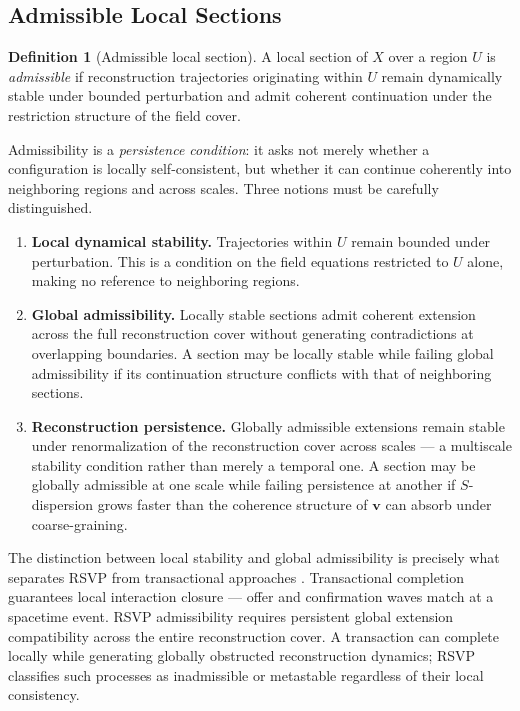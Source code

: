 \documentclass[11pt, a4paper]{article}
\theoremstyle{plain}
\theoremstyle{definition}
\newtheorem{definition}[theorem]{Definition}
\theoremstyle{remark}
\begin{document}
\subsection{Admissible Local Sections}

\begin{definition}[Admissible local section]
\label{def:admissible}
A local section of $X$ over a region $U$ is \emph{admissible} if reconstruction
trajectories originating within $U$ remain dynamically stable under bounded
perturbation and admit coherent continuation under the restriction structure of the
field cover.
\end{definition}

Admissibility is a \emph{persistence condition}: it asks not merely whether a
configuration is locally self-consistent, but whether it can continue coherently into
neighboring regions and across scales. Three notions must be carefully distinguished.

\begin{enumerate}[label=(\roman*)]
  \item \textbf{Local dynamical stability.} Trajectories within $U$ remain bounded
    under perturbation. This is a condition on the field equations restricted to $U$
    alone, making no reference to neighboring regions.

  \item \textbf{Global admissibility.} Locally stable sections admit coherent
    extension across the full reconstruction cover without generating contradictions
    at overlapping boundaries. A section may be locally stable while failing global
    admissibility if its continuation structure conflicts with that of neighboring
    sections.

  \item \textbf{Reconstruction persistence.} Globally admissible extensions remain
    stable under renormalization of the reconstruction cover across scales --- a
    multiscale stability condition rather than merely a temporal one. A section may
    be globally admissible at one scale while failing persistence at another if
    $S$-dispersion grows faster than the coherence structure of $\mathbf{v}$ can
    absorb under coarse-graining.
\end{enumerate}

The distinction between local stability and global admissibility is precisely what
separates RSVP from transactional approaches \cite{kastner2024}. Transactional
completion guarantees local interaction closure --- offer and confirmation waves match
at a spacetime event. RSVP admissibility requires persistent global extension
compatibility across the entire reconstruction cover. A transaction can complete
locally while generating globally obstructed reconstruction dynamics; RSVP classifies
such processes as inadmissible or metastable regardless of their local consistency.
\end{document}
